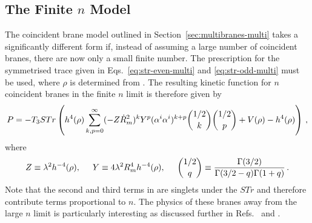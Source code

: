 \subsection{\texorpdfstring{The Finite $n$ Model}{The Finite n Model}}
\label{sec:finitensub-multi}
The coincident brane model outlined in Section~\ref{sec:multibranes-multi}
takes a significantly different form if, instead of assuming a large number of
coincident branes, there are now only a small finite number. The prescription for
the symmetrised trace given in Eqs.~\eqref{eq:str-even-multi} and
\eqref{eq:str-odd-multi} must be used, where $\rho$ is determined from
. 
% 
The resulting kinetic function for $n$ coincident branes in 
the finite $n$ limit is therefore given by
% 
\begin{equation}
\label{eq:genP-multi}
P = -T_3 STr \left(h^4(\rho) \sum_{k,p=0}^{\infty}(-Z\dot{R}_m^2)^k Y^p (\alpha^i
\alpha^i)^{k+p}\binom{1/2}{k} \binom{1/2}{p} + V(\rho)-h^4(\rho) \right) \,,
\end{equation}
% 
where 
% 
\begin{equation}
Z \equiv \lambda^2 h^{-4}(\rho), \hspace{0.5cm} Y \equiv 4\lambda^2 R_m^4
h^{-4}(\rho),
\hspace{0.5cm} \binom{1/2}{q}
\equiv \frac{\Gamma(3/2)}{\Gamma(3/2-q)\Gamma(1+q)} \,.
\end{equation}
% 
Note that the second and third terms in  
are singlets under the $STr$ and therefore contribute terms proportional 
to $n$. The physics of these branes away from the large $n$ limit is particularly interesting as
discussed further
in Refs.~\cite{thomasward} and \cite{Ward:2007gs}.


